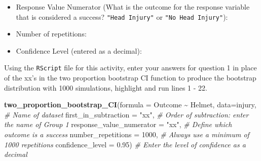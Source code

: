 \documentclass[
]{report}
\newenvironment{Shaded}{\begin{snugshade}}{\end{snugshade}}
\newcommand{\CommentTok}[1]{\textcolor[rgb]{0.56,0.35,0.01}{\textit{#1}}}
\newcommand{\DataTypeTok}[1]{\textcolor[rgb]{0.13,0.29,0.53}{#1}}
\newcommand{\DecValTok}[1]{\textcolor[rgb]{0.00,0.00,0.81}{#1}}
\newcommand{\FloatTok}[1]{\textcolor[rgb]{0.00,0.00,0.81}{#1}}
\newcommand{\KeywordTok}[1]{\textcolor[rgb]{0.13,0.29,0.53}{\textbf{#1}}}
\newcommand{\NormalTok}[1]{#1}
\newcommand{\OperatorTok}[1]{\textcolor[rgb]{0.81,0.36,0.00}{\textbf{#1}}}
\newcommand{\StringTok}[1]{\textcolor[rgb]{0.31,0.60,0.02}{#1}}
\providecommand{\tightlist}{%
  \setlength{\itemsep}{0pt}\setlength{\parskip}{0pt}}
\begin{document}
\vspace{.2in}

\begin{itemize}
\tightlist
\item
  Response Value Numerator (What is the outcome for the response variable that is considered a success? \texttt{"Head\ Injury"} or \texttt{"No\ Head\ Injury"}):
\end{itemize}

\vspace{.2in}

\begin{itemize}
\tightlist
\item
  Number of repetitions:
\end{itemize}

\vspace{.2in}

\begin{itemize}
\tightlist
\item
  Confidence Level (entered as a decimal):
\end{itemize}

\vspace{.2in}

Using the \texttt{RScript} file for this activity, enter your answers for question 1 in place of the xx's in the two proportion bootstrap CI function to produce the bootstrap distribution with 1000 simulations, highlight and run lines 1 - 22.

\begin{Shaded}
\begin{Highlighting}[]
\KeywordTok{two\_proportion\_bootstrap\_CI}\NormalTok{(}\DataTypeTok{formula =}\NormalTok{ Outcome }\OperatorTok{\textasciitilde{}}\StringTok{ }\NormalTok{Helmet, }
                            \DataTypeTok{data=}\NormalTok{injury, }\CommentTok{\# Name of dataset}
                            \DataTypeTok{first\_in\_subtraction =} \StringTok{"xx"}\NormalTok{, }\CommentTok{\# Order of subtraction: enter the name of Group 1}
                            \DataTypeTok{response\_value\_numerator =} \StringTok{"xx"}\NormalTok{, }\CommentTok{\# Define which outcome is a success }
                            \DataTypeTok{number\_repetitions =} \DecValTok{1000}\NormalTok{, }\CommentTok{\# Always use a minimum of 1000 repetitions}
                            \DataTypeTok{confidence\_level =} \FloatTok{0.95}\NormalTok{) }\CommentTok{\# Enter the level of confidence as a decimal}
\end{Highlighting}
\end{Shaded}
\end{document}

